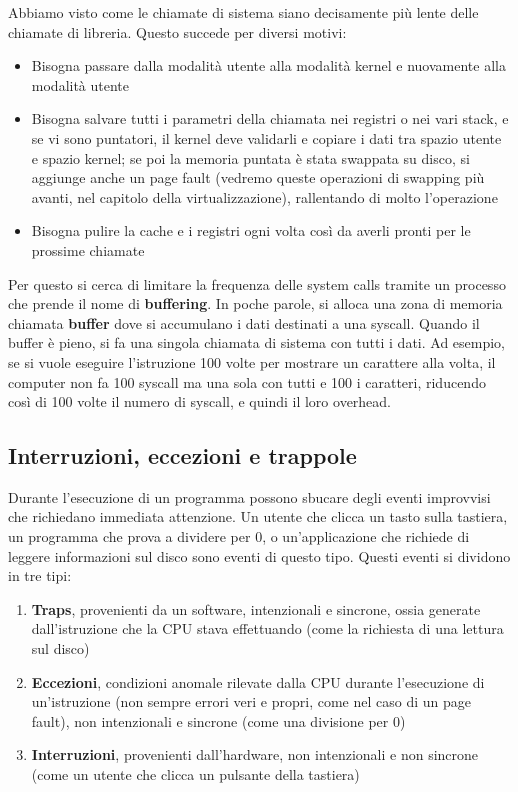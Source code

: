 \documentclass[11pt, a4paper, titlepage, oneside]{scrbook}
\begin{document}
Abbiamo visto come le chiamate di sistema siano decisamente più lente delle chiamate di libreria. Questo succede per diversi motivi:
\begin{itemize}
    \item Bisogna passare dalla modalità utente alla modalità kernel e nuovamente alla modalità utente
    \item Bisogna salvare tutti i parametri della chiamata nei registri o nei vari stack, e se vi sono puntatori, il kernel deve validarli e copiare i dati tra spazio utente e spazio kernel; se poi la memoria puntata è stata swappata su disco, si aggiunge anche un page fault (vedremo queste operazioni di swapping più avanti, nel capitolo della virtualizzazione), rallentando di molto l'operazione
    \item Bisogna pulire la cache e i registri ogni volta così da averli pronti per le prossime chiamate
\end{itemize}

Per questo si cerca di limitare la frequenza delle system calls tramite un processo che prende il nome di \textbf{buffering}. In poche parole, si alloca una zona di memoria chiamata \textbf{buffer} dove si accumulano i dati destinati a una syscall. Quando il buffer è pieno, si fa una singola chiamata di sistema con tutti i dati. Ad esempio, se si vuole eseguire l'istruzione  100 volte per mostrare un carattere alla volta, il computer non fa 100 syscall ma una sola con tutti e 100 i caratteri, riducendo così di 100 volte il numero di syscall, e quindi il loro overhead.

\subsection{Interruzioni, eccezioni e trappole}

Durante l'esecuzione di un programma possono sbucare degli eventi improvvisi che richiedano immediata attenzione. Un utente che clicca un tasto sulla tastiera, un programma che prova a dividere per 0, o un'applicazione che richiede di leggere informazioni sul disco sono eventi di questo tipo. Questi eventi si dividono in tre tipi:
\begin{enumerate}
    \item \textbf{Traps}, provenienti da un software, intenzionali e sincrone, ossia generate dall'istruzione che la CPU stava effettuando (come la richiesta di una lettura sul disco)
    \item \textbf{Eccezioni}, condizioni anomale rilevate dalla CPU durante l'esecuzione di un'istruzione (non sempre errori veri e propri, come nel caso di un page fault), non intenzionali e sincrone (come una divisione per 0)
    \item \textbf{Interruzioni}, provenienti dall'hardware, non intenzionali e non sincrone (come un utente che clicca un pulsante della tastiera)
\end{enumerate}
\end{document}
